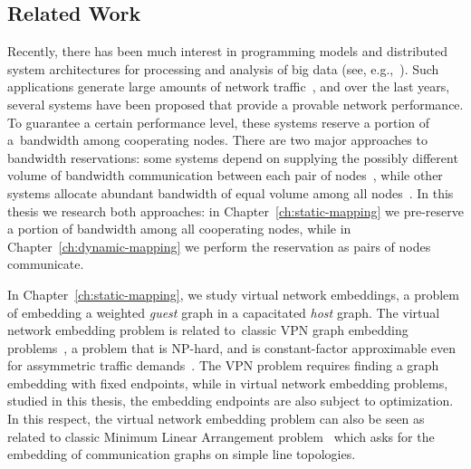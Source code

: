 

\subsection{Related Work}


Recently, there has been much interest in programming models and distributed
system architectures for processing and analysis of big data (see, e.g.,~\cite{mapreduce,nodb,shark}).
Such applications
generate large amounts of network traffic~\cite{orchestra,talk-about,amazonbw},
and over the last years, several systems have been proposed that provide a provable network performance.
To guarantee a certain performance level, these systems reserve a portion of a~bandwidth among cooperating nodes.
There are two major approaches to bandwidth reservations: some systems depend on supplying the possibly different volume of bandwidth communication between each pair of nodes~\cite{faircloud,elasticswitch,seawall}, while other systems allocate abundant bandwidth of equal volume among all nodes~\cite{oktopus,secondnet,drl,gatekeeper,proteus}.
In this thesis we research both approaches: in Chapter~\ref{ch:static-mapping} we pre-reserve a portion of bandwidth among all cooperating nodes, while in Chapter~\ref{ch:dynamic-mapping} we perform the reservation as pairs of nodes communicate.

\medskip

In Chapter~\ref{ch:static-mapping}, we study virtual network embeddings, a problem of embedding a weighted \emph{guest} graph in a capacitated \emph{host} graph.
The virtual network embedding problem is related to~classic VPN graph embedding problems~\cite{gupta2001provisioning,vpn1, vpn2, Goyal2008},
a problem that is NP-hard, and is constant-factor approximable even for assymmetric traffic demands~\cite{vpn-apx}.
The VPN problem requires finding a graph embedding with fixed endpoints, while in virtual network embedding problems, studied in this thesis, the embedding endpoints are also subject to optimization.
In this respect, the virtual network embedding problem can also be seen as related to
classic Minimum Linear Arrangement problem~\cite{EvNaRS99,ord-prob} which asks for the
embedding of communication graphs on simple line topologies.

